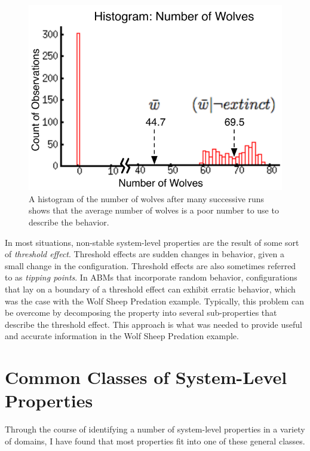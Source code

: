\begin{figure}[ht]
\centering
\includegraphics{images/num_wolves.pdf}
\caption{A histogram of the number of wolves after many successive runs shows that the average number of wolves is a poor number to use to describe the behavior.}
\label{fig:num_wolves}
\end{figure}


In most situations, non-stable system-level properties are the result of some sort of \textit{threshold effect}.
Threshold effects are sudden changes in behavior, given a small change in the configuration.
Threshold effects are also sometimes referred to as \textit{tipping points}.
In ABMs that incorporate random behavior, configurations that lay on a boundary of a threshold effect can exhibit erratic behavior, which was the case with the Wolf Sheep Predation example.
Typically, this problem can be overcome by decomposing the property into several sub-properties that describe the threshold effect. 
This approach is what was needed to provide useful and accurate information in the Wolf Sheep Predation example.

\section{Common Classes of System-Level Properties}

Through the course of identifying a number of system-level properties in a variety of domains, I have found that most properties fit into one of these general classes.


